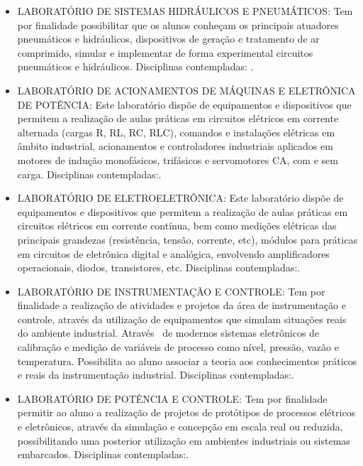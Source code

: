 \begin{itemize}
	\item [LSHIP] LABORATÓRIO DE SISTEMAS HIDRÁULICOS E PNEUMÁTICOS: Tem por finalidade possibilitar que os alunos conheçam os principais
	atuadores pneumáticos e hidráulicos, dispositivos de geração e tratamento de ar comprimido, simular e implementar de
	forma experimental circuitos pneumáticos e hidráulicos. Disciplinas contempladas: \LSHIPdisc.
	
	\item [LAMEP] LABORATÓRIO DE ACIONAMENTOS DE MÁQUINAS E ELETRÔNICA DE POTÊNCIA: Este laboratório dispõe de equipamentos e dispositivos
	que permitem a realização de aulas práticas em circuitos elétricos em corrente alternada (cargas R, RL, RC, RLC),
	comandos e instalações elétricas em âmbito industrial, acionamentos e controladores industriais aplicados em motores de
	indução monofásicos, trifásicos e servomotores CA, com e sem carga. Disciplinas contempladas:\LAMEPdisc.
	
	\item [LEE] LABORATÓRIO DE ELETROELETRÔNICA: Este laboratório dispõe de equipamentos e dispositivos que permitem a realização de aulas práticas em circuitos elétricos em corrente contínua, bem como medições elétricas das principais grandezas (resistência, tensão, corrente, etc), módulos para práticas em circuitos de eletrônica digital e analógica, envolvendo amplificadores operacionais, diodos, transistores, etc. Disciplinas contempladas:\LEEdisc.
	
	\item [LINC] LABORATÓRIO DE INSTRUMENTAÇÃO E CONTROLE: Tem por finalidade a realização de atividades e projetos da área de instrumentação e controle, através da utilização de equipamentos que simulam situações reais do ambiente industrial. Através~ de modernos sistemas eletrônicos de calibração e medição de variáveis de processo como nível, pressão, vazão e temperatura. Possibilita ao aluno associar a teoria aos conhecimentos práticos e reais da instrumentação industrial.
	Disciplinas contempladas:\LINCdisc.
	
	
	\item [LPC] LABORATÓRIO DE POTÊNCIA E CONTROLE: Tem por finalidade permitir ao aluno a realização de projetos de protótipos de processos elétricos e eletrônicos, através da simulação e concepção em escala real ou reduzida, possibilitando uma posterior utilização em ambientes industriais ou sistemas embarcados.
	Disciplinas contempladas:\LPCdisc.
	

\end{itemize}
